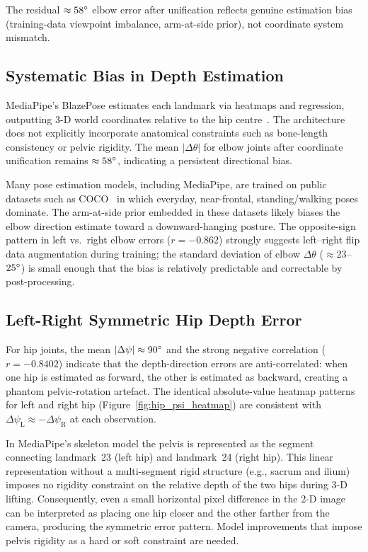 \documentclass[twocolumn]{article}
\begin{document}
The residual $\approx58\degree{}$ elbow error after unification reflects genuine
estimation bias (training-data viewpoint imbalance, arm-at-side prior),
not coordinate system mismatch.

\subsection{Systematic Bias in Depth Estimation}

MediaPipe's BlazePose estimates each landmark via heatmaps and regression,
outputting 3-D world coordinates relative to the hip
centre~\cite{blazepose}. The architecture does not explicitly incorporate
anatomical constraints such as bone-length consistency or pelvic
rigidity. The mean $|\Delta\theta|$ for elbow joints after coordinate
unification remains $\approx58\degree{}$, indicating a persistent directional bias.

Many pose estimation models, including MediaPipe, are trained on public
datasets such as COCO~\cite{coco} in which everyday, near-frontal,
standing/walking poses dominate. The arm-at-side
prior embedded in these datasets likely biases the elbow direction estimate
toward a downward-hanging posture. The opposite-sign pattern in left vs.\
right elbow errors ($r=-0.862$) strongly suggests left--right flip data
augmentation during training; the standard deviation of elbow $\Delta\theta$
($\approx23$--$25\degree{}$) is small enough that the bias is relatively
predictable and correctable by post-processing.

\subsection{Left-Right Symmetric Hip Depth Error}

For hip joints, the mean $|\Delta\psi|\approx90\degree{}$ and the strong negative
correlation ($r=-0.8402$) indicate that the depth-direction errors are
anti-correlated: when one hip is estimated as forward, the other is
estimated as backward, creating a phantom pelvic-rotation artefact. The
identical absolute-value heatmap patterns for left and right hip
(Figure~\ref{fig:hip_psi_heatmap}) are consistent with
$\Delta\psi_{\text{L}} \approx -\Delta\psi_{\text{R}}$ at each observation.

In MediaPipe's skeleton model the pelvis is represented as the segment
connecting landmark~23 (left hip) and landmark~24 (right hip). This linear
representation without a multi-segment rigid structure (e.g., sacrum and
ilium) imposes no rigidity constraint on the relative depth of the two
hips during 3-D lifting. Consequently, even a small horizontal pixel
difference in the 2-D image can be interpreted as placing one hip closer
and the other farther from the camera, producing the symmetric error
pattern. Model improvements that impose pelvis rigidity as a hard or soft
constraint are needed.
\end{document}
